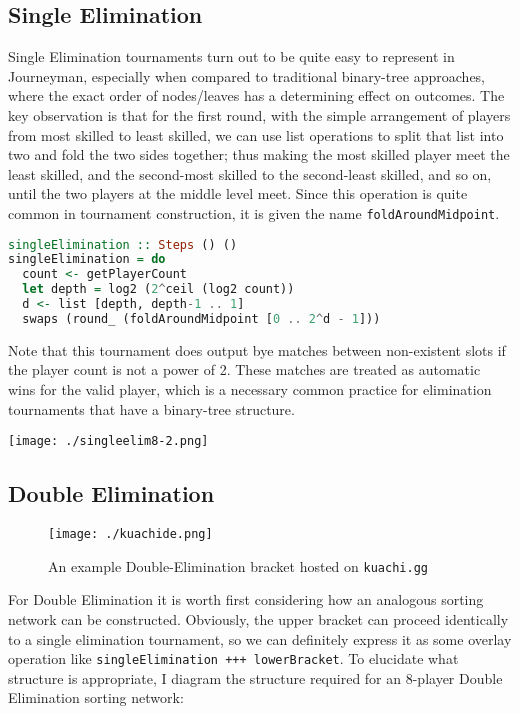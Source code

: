 \documentclass[a4,11pt,twoside,final,hidelinks]{article}
\begin{document}
\subsection{Single Elimination}
\label{sec:orge2aa0d1}

Single Elimination tournaments turn out to be quite easy to represent in
Journeyman, especially when compared to traditional binary-tree approaches,
where the exact order of nodes/leaves has a determining effect on outcomes. The
key observation is that for the first round, with the simple arrangement of
players from most skilled to least skilled, we can use list operations to split
that list into two and fold the two sides together; thus making the most skilled
player meet the least skilled, and the second-most skilled to the second-least
skilled, and so on, until the two players at the middle level meet. Since this
operation is quite common in tournament construction, it is given the name
\texttt{foldAroundMidpoint}.

\begin{lstlisting}[language=haskell,numbers=none]
singleElimination :: Steps () ()
singleElimination = do
  count <- getPlayerCount
  let depth = log2 (2^ceil (log2 count))
  d <- list [depth, depth-1 .. 1]
  swaps (round_ (foldAroundMidpoint [0 .. 2^d - 1]))
\end{lstlisting}

Note that this tournament does output bye matches between non-existent slots if
the player count is not a power of 2. These matches are treated as automatic
wins for the valid player, which is a necessary common practice for elimination
tournaments that have a binary-tree structure.

\begin{center}
\texttt{[image: ./singleelim8-2.png]}
\end{center}

\newpage

\subsection{Double Elimination}
\label{sec:org4b87782}

\begin{figure}[htbp]
\centering
\texttt{[image: ./kuachide.png]}
\caption{An example Double-Elimination bracket hosted on \texttt{kuachi.gg} \autocite{aql51}}
\end{figure}

For Double Elimination it is worth first considering how an analogous sorting
network can be constructed. Obviously, the upper bracket can proceed identically
to a single elimination tournament, so we can definitely express it as some
overlay operation like \texttt{singleElimination +++ lowerBracket}. To elucidate what
structure is appropriate, I diagram the structure required for an 8-player
Double Elimination sorting network:
\end{document}
